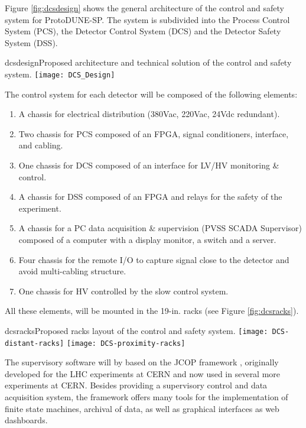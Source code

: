 Figure \ref{fig:dcsdesign} shows the general architecture of the control and safety system for ProtoDUNE-SP.
The system is subdivided into the Process Control System (PCS), the Detector Control System (DCS) and the Detector Safety System (DSS). 

\begin{cdrfigure}{dcsdesign}{Proposed architecture and technical solution of the control and safety system.}
\texttt{[image: DCS\_Design]}
\end{cdrfigure}

The control system for each detector will be composed of the following elements:
\begin{enumerate}
\item	A chassis for electrical distribution (380Vac, 220Vac, 24Vdc redundant).
\item	Two chassis for PCS composed of an FPGA, signal conditioners, interface, and cabling.
\item	One chassis for DCS  composed of an interface for LV/HV monitoring \& control.
\item	A chassis for DSS composed of an FPGA and relays for the safety of the experiment.
\item	A chassis for a PC data acquisition \& supervision (PVSS SCADA Supervisor) composed of a computer with a display monitor, a switch and a 
server.
\item	Four chassis for the remote I/O to capture signal close to the detector and avoid multi-cabling structure.
\item	One chassis for HV controlled by the slow control system.
\end{enumerate}
All these elements, will be mounted in the 19-in. racks (see Figure \ref{fig:dcsracks}).
\begin{cdrfigure}{dcsracks}{Proposed racks layout of the control and safety system.}
\texttt{[image: DCS-distant-racks]}
\texttt{[image: DCS-proximity-racks]}
\end{cdrfigure}

The supervisory software will by based on the JCOP framework , originally developed for the LHC experiments at CERN and now used in several more experiments at CERN. Besides providing a supervisory control and data acquisition system, the framework offers many tools for the implementation of finite state machines, archival of data, as well as graphical interfaces as web dashboards.


